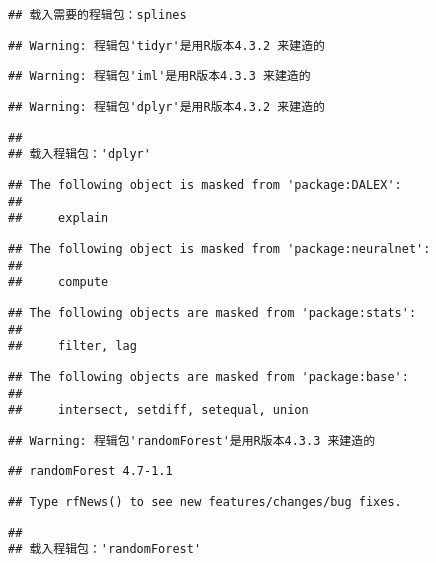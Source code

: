 \documentclass[
]{article}
\begin{document}
\begin{verbatim}
## 载入需要的程辑包：splines
\end{verbatim}

\begin{verbatim}
## Warning: 程辑包'tidyr'是用R版本4.3.2 来建造的
\end{verbatim}

\begin{verbatim}
## Warning: 程辑包'iml'是用R版本4.3.3 来建造的
\end{verbatim}

\begin{verbatim}
## Warning: 程辑包'dplyr'是用R版本4.3.2 来建造的
\end{verbatim}

\begin{verbatim}
## 
## 载入程辑包：'dplyr'
\end{verbatim}

\begin{verbatim}
## The following object is masked from 'package:DALEX':
## 
##     explain
\end{verbatim}

\begin{verbatim}
## The following object is masked from 'package:neuralnet':
## 
##     compute
\end{verbatim}

\begin{verbatim}
## The following objects are masked from 'package:stats':
## 
##     filter, lag
\end{verbatim}

\begin{verbatim}
## The following objects are masked from 'package:base':
## 
##     intersect, setdiff, setequal, union
\end{verbatim}

\begin{verbatim}
## Warning: 程辑包'randomForest'是用R版本4.3.3 来建造的
\end{verbatim}

\begin{verbatim}
## randomForest 4.7-1.1
\end{verbatim}

\begin{verbatim}
## Type rfNews() to see new features/changes/bug fixes.
\end{verbatim}

\begin{verbatim}
## 
## 载入程辑包：'randomForest'
\end{verbatim}
\end{document}
